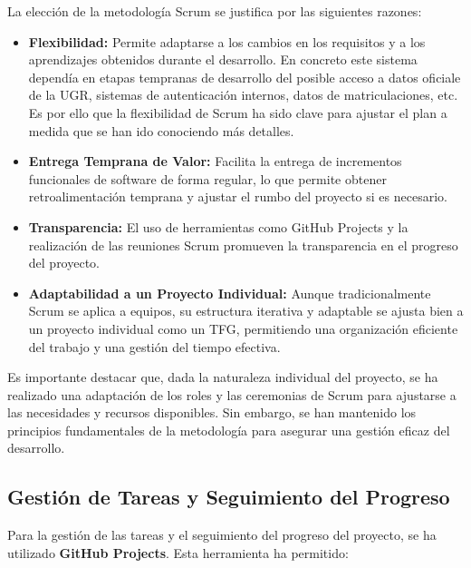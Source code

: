 La elección de la metodología Scrum se justifica por las siguientes razones:

\begin{itemize}
    \item \textbf{Flexibilidad:} Permite adaptarse a los cambios en los requisitos y a los aprendizajes obtenidos durante el desarrollo. En concreto este sistema dependía en etapas tempranas de desarrollo del posible acceso a datos oficiale de la UGR, sistemas de autenticación internos, datos de matriculaciones, etc. Es por ello que la flexibilidad de Scrum ha sido clave para ajustar el plan a medida que se han ido conociendo más detalles.
    \item \textbf{Entrega Temprana de Valor:} Facilita la entrega de incrementos funcionales de software de forma regular, lo que permite obtener retroalimentación temprana y ajustar el rumbo del proyecto si es necesario.
    \item \textbf{Transparencia:} El uso de herramientas como GitHub Projects y la realización de las reuniones Scrum promueven la transparencia en el progreso del proyecto.
    \item \textbf{Adaptabilidad a un Proyecto Individual:} Aunque tradicionalmente Scrum se aplica a equipos, su estructura iterativa y adaptable se ajusta bien a un proyecto individual como un TFG, permitiendo una organización eficiente del trabajo y una gestión del tiempo efectiva.
\end{itemize}

Es importante destacar que, dada la naturaleza individual del proyecto, se ha realizado una adaptación de los roles y las ceremonias de Scrum para ajustarse a las necesidades y recursos disponibles. 
Sin embargo, se han mantenido los principios fundamentales de la metodología para asegurar una gestión eficaz del desarrollo.

\subsection{Gestión de Tareas y Seguimiento del Progreso}

Para la gestión de las tareas y el seguimiento del progreso del proyecto, se ha utilizado \textbf{GitHub Projects}\cite{calendarugr_github}. Esta herramienta ha permitido:

